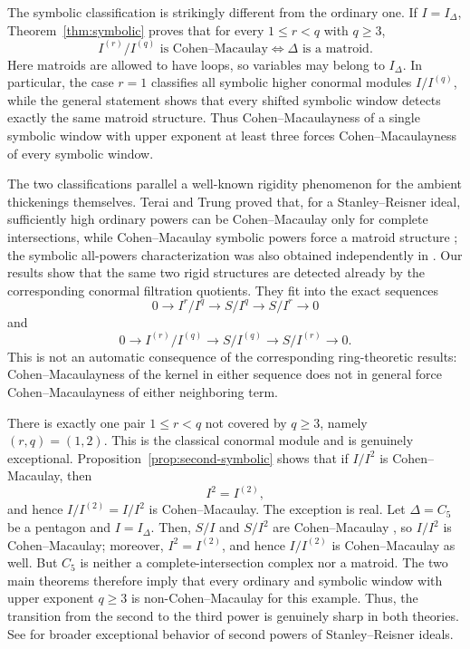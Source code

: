 \documentclass[12pt]{amsart}
\theoremstyle{plain}
\theoremstyle{definition}
\theoremstyle{remark}
\begin{document}
The symbolic classification is strikingly different from the ordinary one.
If $I=I_\Delta$, Theorem~\ref{thm:symbolic} proves that for every
$1\le r<q$ with $q\ge3$,
$$
I^{(r)}/I^{(q)}\text{ is Cohen--Macaulay}
\Longleftrightarrow
\Delta\text{ is a matroid}.
$$
Here matroids are allowed to have loops, so variables may belong to
$I_\Delta$. In particular, the case $r=1$ classifies all symbolic higher
conormal modules $I/I^{(q)}$, while the general statement shows that every
shifted symbolic window detects exactly the same matroid structure. Thus
Cohen--Macaulayness of a single symbolic window with upper exponent at least
three forces Cohen--Macaulayness of every symbolic window.

The two classifications parallel a well-known rigidity phenomenon for the
ambient thickenings themselves. Terai and Trung proved that, for a
Stanley--Reisner ideal, sufficiently high ordinary powers can be
Cohen--Macaulay only for complete intersections, while Cohen--Macaulay
symbolic powers force a matroid structure \cite{TeraiTrung}; the symbolic
all-powers characterization was also obtained independently in
\cite{MinhTrung,Varbaro}. Our results show that the same two rigid structures
are detected already by the corresponding conormal filtration quotients. They
fit into the exact sequences
$$
0\longrightarrow I^r/I^q\longrightarrow S/I^q\longrightarrow S/I^r\longrightarrow0
$$
and
$$
0\longrightarrow I^{(r)}/I^{(q)}\longrightarrow S/I^{(q)}
\longrightarrow S/I^{(r)}\longrightarrow0.
$$
This is not an automatic consequence of the corresponding ring-theoretic
results: Cohen--Macaulayness of the kernel in either sequence does not in
general force Cohen--Macaulayness of either neighboring term.

There is exactly one pair $1\le r<q$ not covered by $q\ge3$, namely
$(r,q)=(1,2)$. This is the classical conormal module and is genuinely
exceptional. Proposition~\ref{prop:second-symbolic} shows that if $I/I^2$ is
Cohen--Macaulay, then
$$
I^2=I^{(2)},
$$
and hence $I/I^{(2)}=I/I^2$ is Cohen--Macaulay. The exception is real. Let
$\Delta=C_5$ be a pentagon and $I=I_\Delta$. Then, $S/I$ and $S/I^2$ are
Cohen--Macaulay \cite{FaridiHibi}, so $I/I^2$ is Cohen--Macaulay; moreover,
$I^2=I^{(2)}$, and hence $I/I^{(2)}$ is Cohen--Macaulay as well. But $C_5$ is
neither a complete-intersection complex nor a matroid. The two main theorems
therefore imply that every ordinary and symbolic window with upper exponent
$q\ge3$ is non-Cohen--Macaulay for this example. Thus, the transition from the
second to the third power is genuinely sharp in both theories. See
\cite{RinaldoTeraiYoshida} for broader exceptional behavior of second powers
of Stanley--Reisner ideals.
\end{document}
